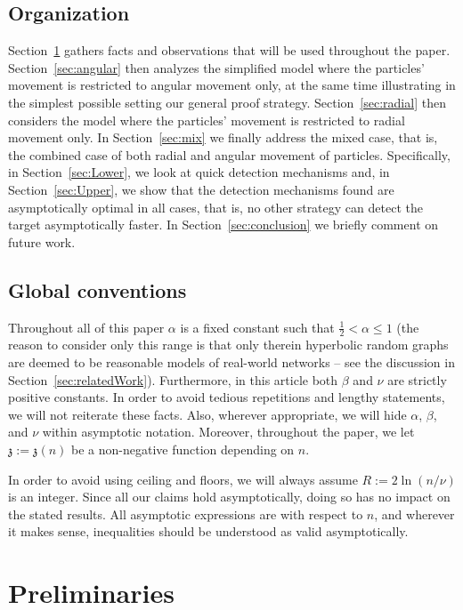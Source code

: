 \documentclass[12pt]{article}
\renewcommand{\ss}{\mathfrak{z}}
\begin{document}
\subsection{Organization}
%
Section~\ref{preliminaries} gathers facts and observations that will be used throughout the paper. Section~\ref{sec:angular} then analyzes the simplified model where the particles' movement is restricted to angular movement only, at the same time illustrating in the simplest possible setting our general proof strategy. Section~\ref{sec:radial} then considers the model where the particles' movement is restricted to radial movement only. In Section~\ref{sec:mix} we finally address the mixed case, that is, the combined case of both radial and angular movement of particles. Specifically, in Section~\ref{sec:Lower}, we look at quick detection mechanisms and, in Section~\ref{sec:Upper}, we show that the detection mechanisms found  are asymptotically optimal in all cases, that is, no other strategy can detect the target asymptotically faster.
In Section~\ref{sec:conclusion} we briefly comment on future work.


\subsection{Global conventions}
%
Throughout all of this paper $\alpha$ is a fixed constant such that $\frac12<\alpha\le 1$
(the reason to consider only this range is that only therein hyperbolic random graphs are deemed to be reasonable models of real-world networks -- see the discussion in Section~\ref{sec:relatedWork}). 
Furthermore, in this article both $\beta$ and $\nu$ are strictly positive constants. In order to avoid tedious repetitions and lengthy statements, we will not reiterate these facts. 
Also, wherever appropriate, we will hide $\alpha$, $\beta$, and $\nu$ within asymptotic notation.
Moreover, throughout the paper, we let~$\ss:=\ss(n)$ be a non-negative function depending on $n$.

In order to avoid using ceiling and floors, we will always assume $R:=2\ln(n/\nu)$ is an integer. Since all our claims hold asymptotically, doing so has no impact on the stated results. 
All asymptotic expressions are with respect to $n$, and wherever it makes sense, inequalities should be understood as valid asymptotically.

\section{Preliminaries}\label{preliminaries}
%
%

\end{document}

